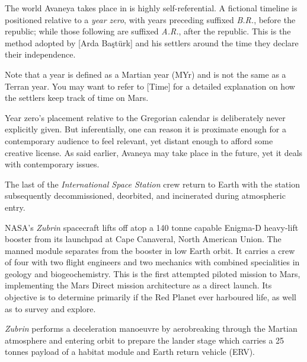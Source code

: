 

\startlines

The world Avaneya takes place in is highly self-referential. A fictional timeline is positioned relative to a {\it year zero}, with years preceding suffixed {\it B.R.}, before the republic; while those following are suffixed {\it A.R.}, after the republic. This is the method adopted by [Arda Baştürk] and his settlers around the time they declare their independence.

Note that a year is defined as a Martian year (MYr) and is not the same as a Terran year. You may want to refer to [Time] for a detailed explanation on how the settlers keep track of time on Mars.

Year zero's placement relative to the Gregorian calendar is deliberately never explicitly given. But inferentially, one can reason it is proximate enough for a contemporary audience to feel relevant, yet distant enough to afford some creative license. As said earlier, Avaneya may take place in the future, yet it deals with contemporary issues.
\crlf

The last of the {\it International Space Station} crew return to Earth with the station subsequently decommissioned, deorbited, and incinerated during atmospheric entry.
\StopTimelineDate

NASA's {\it Zubrin} spacecraft lifts off atop a 140 tonne capable Enigma-D heavy-lift booster from its launchpad at Cape Canaveral, North American Union. The manned module separates from the booster in low Earth orbit. It carries a crew of four with two flight engineers and two mechanics with combined specialities in geology and biogeochemistry. This is the first attempted piloted mission to Mars, implementing the Mars Direct mission architecture as a direct launch. Its objective is to determine primarily if the Red Planet ever harboured life, as well as to survey and explore.
\StopTimelineDate

{\it Zubrin} performs a deceleration manoeuvre by aerobreaking through the Martian atmosphere and entering orbit to prepare the lander stage which carries a 25 tonnes payload of a habitat module and Earth return vehicle (ERV).
\StopTimelineDate

